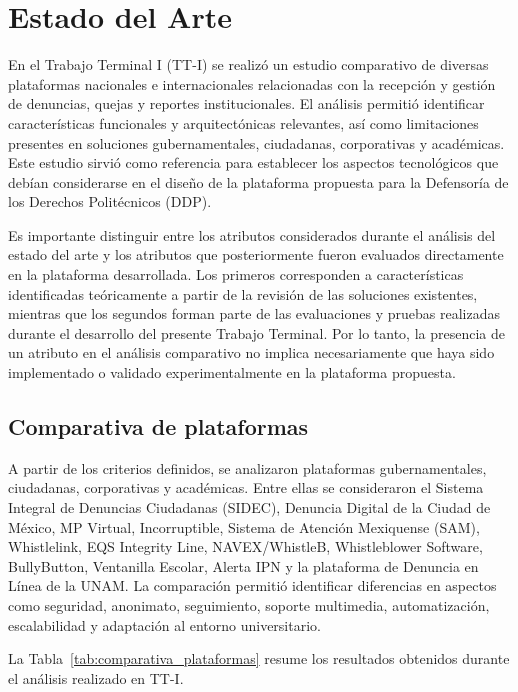 \chapter{Estado del Arte}

En el Trabajo Terminal I (TT-I) se realizó un estudio comparativo de diversas plataformas nacionales e internacionales relacionadas con la recepción y gestión de denuncias, quejas y reportes institucionales. El análisis permitió identificar características funcionales y arquitectónicas relevantes, así como limitaciones presentes en soluciones gubernamentales, ciudadanas, corporativas y académicas. Este estudio sirvió como referencia para establecer los aspectos tecnológicos que debían considerarse en el diseño de la plataforma propuesta para la Defensoría de los Derechos Politécnicos (DDP).

Es importante distinguir entre los atributos considerados durante el análisis del estado del arte y los atributos que posteriormente fueron evaluados directamente en la plataforma desarrollada. Los primeros corresponden a características identificadas teóricamente a partir de la revisión de las soluciones existentes, mientras que los segundos forman parte de las evaluaciones y pruebas realizadas durante el desarrollo del presente Trabajo Terminal. Por lo tanto, la presencia de un atributo en el análisis comparativo no implica necesariamente que haya sido implementado o validado experimentalmente en la plataforma propuesta.

\section{Comparativa de plataformas}

A partir de los criterios definidos, se analizaron plataformas gubernamentales, ciudadanas, corporativas y académicas. Entre ellas se consideraron el Sistema Integral de Denuncias Ciudadanas (SIDEC), Denuncia Digital de la Ciudad de México, MP Virtual, Incorruptible, Sistema de Atención Mexiquense (SAM), Whistlelink, EQS Integrity Line, NAVEX/WhistleB, Whistleblower Software, BullyButton, Ventanilla Escolar, Alerta IPN y la plataforma de Denuncia en Línea de la UNAM. La comparación permitió identificar diferencias en aspectos como seguridad, anonimato, seguimiento, soporte multimedia, automatización, escalabilidad y adaptación al entorno universitario.

La Tabla~\ref{tab:comparativa_plataformas} resume los resultados obtenidos durante el análisis realizado en TT-I.

